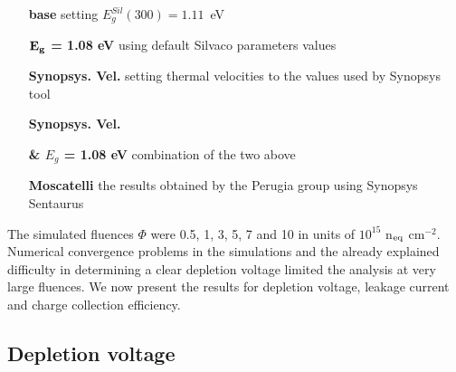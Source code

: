 \begin{center}
\begin{varwidth}{\textwidth}
\begin{itemize}
\item[\bf base] setting $E^{Sil}_g(300)=1.11$~eV
\item[\bf ${\bf E_g}$ = 1.08 eV] using default Silvaco parameters values
\item[\bf Synopsys. Vel.] setting thermal velocities to the values used by Synopsys tool
\item[\bf Synopsys. Vel.]  
\item [\bf \& $E_g$ = 1.08 eV]combination of the two above 
\item[\bf Moscatelli] the results obtained by the Perugia group using Synopsys Sentaurus
\end{itemize}
\end{varwidth}
\end{center}

The simulated fluences $\Phi$ were 0.5, 1, 3, 5, 7 and 10 in units of $10^{15}$ n$_{\rm eq}$ cm$^{-2}$. 
Numerical convergence problems in the simulations and the already explained difficulty in determining 
a clear depletion voltage  limited the analysis  at very large fluences. We now present the results 
for depletion voltage, leakage current and charge collection efficiency.

\subsection{Depletion voltage}

